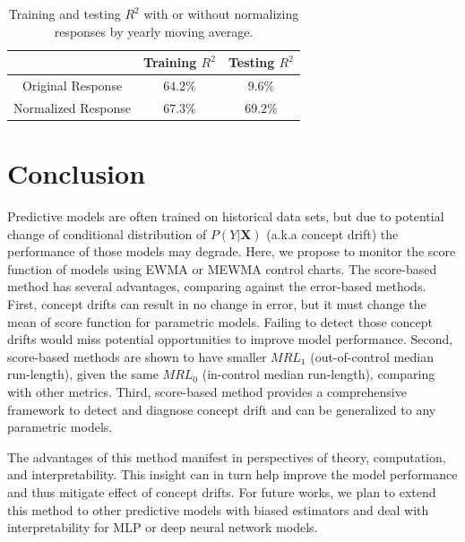 \documentclass[twoside,11pt]{article}
\begin{document}
\begin{table}[!htbp]
\centering
\begin{tabular}{|c|c|c|} \hline
 & Training $R^2$ & Testing $R^2$ \\ \hline
 Original Response & $64.2\%$ & $9.6\%$ \\ \hline 
 Normalized Response & $\bm{67.3}\%$ & $\bm{69.2}\%$ \\ \hline
\end{tabular}
\caption{Training and testing $R^2$ with or without normalizing responses by yearly moving average.}
\label{table:fit_pred_preproc}
\end{table}

\section{Conclusion}
Predictive models are often trained on historical data sets, but due to potential change of conditional distribution of $P (Y|\bm {X})$ (a.k.a concept drift) the performance of those models may degrade. Here, we propose to monitor the score function of models using EWMA or MEWMA control charts. The score-based method has several advantages, comparing against the error-based methods. First, concept drifts can result in no change in error, but it must change the mean of score function for parametric models. Failing to detect those concept drifts would miss potential opportunities to improve model performance. Second, score-based methods are shown to have smaller $MRL_1$ (out-of-control median run-length), given the same $MRL_0$ (in-control median run-length), comparing with other metrics. Third, score-based method provides a comprehensive framework to detect and diagnose concept drift and can be generalized to any parametric models. 

The advantages of this method manifest in perspectives of theory, computation, and interpretability. This insight can in turn help improve the model performance and thus mitigate effect of concept drifts. For future works, we plan to extend this method to other predictive models with biased estimators and deal with interpretability for MLP or deep neural network models.

\end{document}
